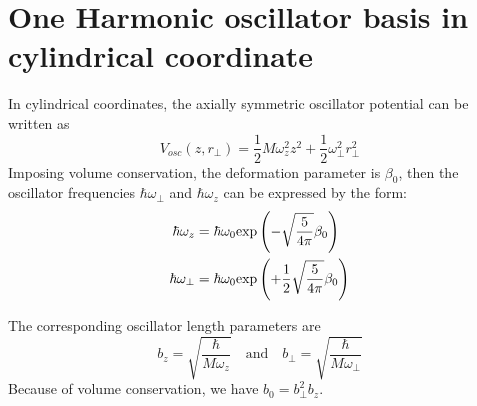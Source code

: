   \section{One Harmonic oscillator basis in cylindrical coordinate}
  In cylindrical coordinates, the axially symmetric oscillator potential can be written as
  \begin{equation}
    V_{osc}(z, r_{\perp}) = \frac{1}{2} M \omega_z^2 z^2 + \frac{1}{2} \omega_{\perp}^2 r_{\perp}^2  \label{oc_potential}
  \end{equation}
  Imposing volume conservation, the deformation parameter is $\beta_0$, then the oscillator frequencies $\hbar \omega_{\perp}$ and $\hbar \omega_{z}$ can be expressed by the form:
  \begin{equation}
    \begin{aligned}
      \hbar \omega_{z} &= \hbar \omega_0 {\rm exp}\left( -\sqrt{\frac{5}{4\pi}} \beta_0 \right) \\
      \hbar \omega_{\perp} &= \hbar \omega_0 {\rm exp}\left( + \frac{1}{2} \sqrt{\frac{5}{4\pi}} \beta_0\right)    \label{oc_}
    \end{aligned}
  \end{equation}
  
  The corresponding oscillator length parameters are 
  \begin{equation}
    b_z = \sqrt{ \frac{\hbar}{M \omega_z} }  \quad \text{and}  \quad  b_{\perp} = \sqrt{ \frac{\hbar}{M \omega_{\perp} } }
  \end{equation}
  Because of volume conservation, we have $b_0 = b_{\perp}^2 b_{z}$.

